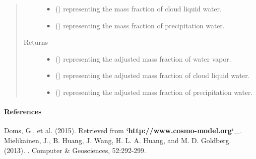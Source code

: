 \documentclass[letterpaper,10pt,english]{sphinxmanual}
\begin{document}
\begin{fulllineitems}
\begin{fulllineitems}
\begin{quote}
\begin{description}
\begin{itemize}
\item {} 
 () \textendash{}  representing the mass fraction of cloud liquid water.

\item {} 
 () \textendash{}  representing the mass fraction of precipitation water.

\end{itemize}

\item[{Returns}] \leavevmode
\begin{itemize}
\item {} 
 () \textendash{}  representing the adjusted mass fraction of water vapor.

\item {} 
 () \textendash{}  representing the adjusted mass fraction of cloud liquid water.

\item {} 
 () \textendash{}  representing the adjusted mass fraction of precipitation water.

\end{itemize}


\end{description}\end{quote}
\paragraph{References}

Doms, G., et al. (2015).  Retrieved from {\color{red}\bfseries{}{}`http://www.cosmo-model.org{}`\_}.              Mielikainen, J., B. Huang, J. Wang, H. L. A. Huang, and M. D. Goldberg. (2013).                         . Computer \& Geosciences, 52:292-299.

\end{fulllineitems}


\end{fulllineitems}
\end{document}
